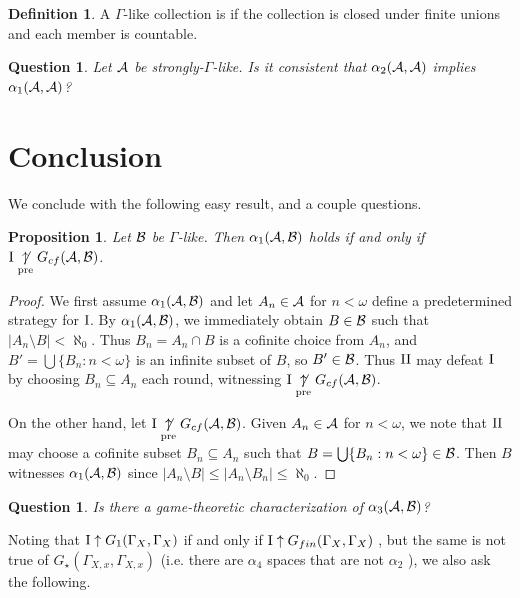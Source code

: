 \documentclass{amsart}
\theoremstyle{plain}
\newtheorem{proposition}[theorem]{Proposition}
\newtheorem{question}[theorem]{Question}
\theoremstyle{definition}
\newtheorem{definition}[theorem]{Definition}
\theoremstyle{remark}
\theoremstyle{plain}
\theoremstyle{definition}
\theoremstyle{remark}
\begin{document}
\begin{definition}
A \(\Gamma\)-like collection is 
if the collection is closed under finite unions and each member
is countable.
\end{definition}

\begin{question}
Let \(\mathcal{A}\) be strongly-\(\Gamma\)-like.
Is it consistent that \(\alpha_2(\mathcal{A},\mathcal{A})\)
implies \(\alpha_1(\mathcal{A},\mathcal{A})\)?
\end{question}


\section{Conclusion}

We conclude with the following easy result, and a couple questions.

\begin{proposition}
Let \(\mathcal{B}\) be \(\Gamma\)-like. Then \(\alpha_1(\mathcal{A},\mathcal{B})\) holds if and only
if \(\mathrm{I}\underset{\text{pre}}{\not\uparrow} G_{cf}(\mathcal{A},\mathcal{B})\).
\end{proposition}

\begin{proof}
We first assume \(\alpha_1(\mathcal{A},\mathcal{B})\) and let \(A_n\in\mathcal{A}\) for \(n<\omega\)
define a predetermined strategy for \(\mathrm{I}\). By \(\alpha_1(\mathcal{A},\mathcal{B})\), we
immediately obtain \(B\in\mathcal{B}\) such that \(|A_n\setminus B|<\aleph_0\). Thus
\(B_n=A_n\cap B\) is a cofinite choice from \(A_n\), and 
\(B'=\bigcup\{B_n:n<\omega\}\) is an infinite subset of \(B\),
so \(B'\in\mathcal{B}\). Thus \(\mathrm{II}\) may defeat \(\mathrm{I}\) by choosing
\(B_n\subseteq A_n\) each round, witnessing \(\mathrm{I}\underset{\text{pre}}{\not\uparrow} G_{cf}(\mathcal{A},\mathcal{B})\).

On the other hand, let \(\mathrm{I}\underset{\text{pre}}{\not\uparrow} G_{cf}(\mathcal{A},\mathcal{B})\). Given \(A_n\in\mathcal{A}\)
for \(n<\omega\), we note that \(\mathrm{II}\) may choose a cofinite subset \(B_n\subseteq A_n\)
such that \(B=\bigcup\{B_n:n<\omega\}\in\mathcal{B}\). Then \(B\) witnesses \(\alpha_1(\mathcal{A},\mathcal{B})\)
since \(|A_n\setminus B|\leq|A_n\setminus B_n|\leq\aleph_0\).
\end{proof}

\begin{question}
Is there a game-theoretic characterization of \(\alpha_3(\mathcal{A},\mathcal{B})\)?
\end{question}

Noting that \(\mathrm{I}\uparrow G_1(\Gamma_X,\Gamma_X)\) if and only if
\(\mathrm{I}\uparrow G_{fin}(\Gamma_X,\Gamma_X)\) \cite{MR2417134}, but
the same is not true of \(G_\star(\Gamma_{X,x},\Gamma_{X,x})\)
(i.e. there are \(\alpha_4\) spaces that are not \(\alpha_2\)
\cite{shakhmatov2002convergence}),
we also ask the following.
\end{document}
